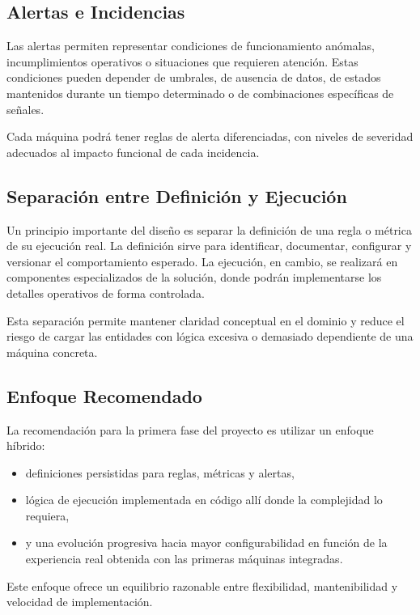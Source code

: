 \subsection{Alertas e Incidencias}

Las alertas permiten representar condiciones de funcionamiento anómalas, incumplimientos operativos o situaciones que requieren atención. Estas condiciones pueden depender de umbrales, de ausencia de datos, de estados mantenidos durante un tiempo determinado o de combinaciones específicas de señales.

Cada máquina podrá tener reglas de alerta diferenciadas, con niveles de severidad adecuados al impacto funcional de cada incidencia.

\subsection{Separación entre Definición y Ejecución}

Un principio importante del diseño es separar la definición de una regla o métrica de su ejecución real. La definición sirve para identificar, documentar, configurar y versionar el comportamiento esperado. La ejecución, en cambio, se realizará en componentes especializados de la solución, donde podrán implementarse los detalles operativos de forma controlada.

Esta separación permite mantener claridad conceptual en el dominio y reduce el riesgo de cargar las entidades con lógica excesiva o demasiado dependiente de una máquina concreta.

\subsection{Enfoque Recomendado}

La recomendación para la primera fase del proyecto es utilizar un enfoque híbrido:

\begin{itemize}
    \item definiciones persistidas para reglas, métricas y alertas,
    \item lógica de ejecución implementada en código allí donde la complejidad lo requiera,
    \item y una evolución progresiva hacia mayor configurabilidad en función de la experiencia real obtenida con las primeras máquinas integradas.
\end{itemize}

Este enfoque ofrece un equilibrio razonable entre flexibilidad, mantenibilidad y velocidad de implementación.
